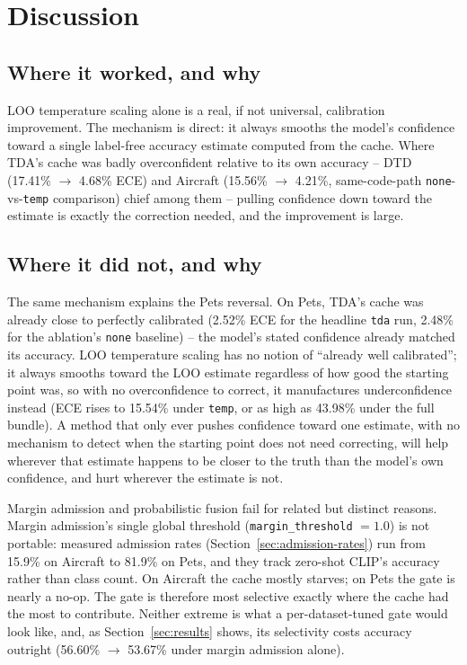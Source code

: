 \section{Discussion}
\label{sec:discussion}

\subsection{Where it worked, and why}

LOO temperature scaling alone is a real, if not universal, calibration improvement. The
mechanism is direct: it always smooths the model's confidence toward a single label-free
accuracy estimate computed from the cache. Where TDA's cache was badly overconfident relative
to its own accuracy -- DTD (17.41\% $\rightarrow$ 4.68\% ECE) and Aircraft (15.56\%
$\rightarrow$ 4.21\%, same-code-path \texttt{none}-vs-\texttt{temp} comparison) chief among
them -- pulling confidence down toward the estimate is exactly the correction needed, and the
improvement is large.

\subsection{Where it did not, and why}

The same mechanism explains the Pets reversal. On Pets, TDA's cache was already close to
perfectly calibrated (2.52\% ECE for the headline \texttt{tda} run, 2.48\% for the ablation's
\texttt{none} baseline) -- the model's stated confidence already matched its
accuracy. LOO temperature scaling has no notion of ``already well calibrated''; it always
smooths toward the LOO estimate regardless of how good the starting point was, so with no
overconfidence to correct, it manufactures underconfidence instead (ECE rises to 15.54\% under
\texttt{temp}, or as high as 43.98\% under the full bundle). A method that only ever pushes
confidence toward one estimate, with no mechanism to detect when the starting point does not
need correcting, will help wherever that estimate happens to be closer to the truth than the
model's own confidence, and hurt wherever the estimate is not.

Margin admission and probabilistic fusion fail for related but distinct reasons. Margin
admission's single global threshold (\texttt{margin\_threshold} $= 1.0$) is not portable:
measured admission rates (Section~\ref{sec:admission-rates}) run from 15.9\% on Aircraft to
81.9\% on Pets, and they track zero-shot CLIP's accuracy rather than class count. On Aircraft the cache
mostly starves; on Pets the gate is nearly a no-op. The gate is therefore most selective exactly
where the cache had the most to contribute. Neither
extreme is what a per-dataset-tuned gate would look like, and, as Section~\ref{sec:results} shows, its
selectivity costs accuracy outright (56.60\% $\rightarrow$ 53.67\% under margin admission
alone).


